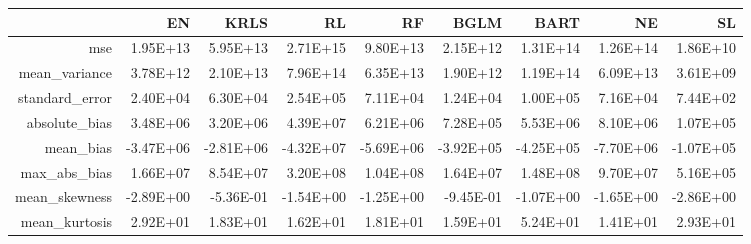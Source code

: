 \begin{table}[ht]
\centering
\begin{tabular}{rrrrrrrrr}
  \hline
 & EN & KRLS & RL & RF & BGLM & BART & NE & SL \\ 
  \hline
mse & 1.95E+13 & 5.95E+13 & 2.71E+15 & 9.80E+13 & 2.15E+12 & 1.31E+14 & 1.26E+14 & 1.86E+10 \\ 
  mean\_variance & 3.78E+12 & 2.10E+13 & 7.96E+14 & 6.35E+13 & 1.90E+12 & 1.19E+14 & 6.09E+13 & 3.61E+09 \\ 
  standard\_error & 2.40E+04 & 6.30E+04 & 2.54E+05 & 7.11E+04 & 1.24E+04 & 1.00E+05 & 7.16E+04 & 7.44E+02 \\ 
  absolute\_bias & 3.48E+06 & 3.20E+06 & 4.39E+07 & 6.21E+06 & 7.28E+05 & 5.53E+06 & 8.10E+06 & 1.07E+05 \\ 
  mean\_bias & -3.47E+06 & -2.81E+06 & -4.32E+07 & -5.69E+06 & -3.92E+05 & -4.25E+05 & -7.70E+06 & -1.07E+05 \\ 
  max\_abs\_bias & 1.66E+07 & 8.54E+07 & 3.20E+08 & 1.04E+08 & 1.64E+07 & 1.48E+08 & 9.70E+07 & 5.16E+05 \\ 
  mean\_skewness & -2.89E+00 & -5.36E-01 & -1.54E+00 & -1.25E+00 & -9.45E-01 & -1.07E+00 & -1.65E+00 & -2.86E+00 \\ 
  mean\_kurtosis & 2.92E+01 & 1.83E+01 & 1.62E+01 & 1.81E+01 & 1.59E+01 & 5.24E+01 & 1.41E+01 & 2.93E+01 \\ 
   \hline
\end{tabular}
\end{table}
